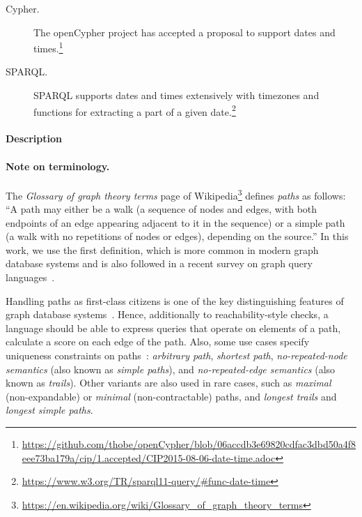 \begin{description}
\item[Cypher.] The openCypher project has accepted a proposal to support dates and times.\footnote{\url{https://github.com/thobe/openCypher/blob/06accdb3e69820cdfac3dbd50a4f8eee73ba179a/cip/1.accepted/CIP2015-08-06-date-time.adoc}}

\item[SPARQL.] SPARQL supports dates and times extensively with timezones and functions for extracting a part of a given date.\footnote{\url{https://www.w3.org/TR/sparql11-query/\#func-date-time}}
\end{description}





\paragraph{Description}

\paragraph{Note on terminology.} The \emph{Glossary of graph theory terms} page of Wikipedia\footnote{\url{https://en.wikipedia.org/wiki/Glossary_of_graph_theory_terms}} defines \emph{paths} as follows: ``A path may either be a walk (a sequence of nodes and edges, with both endpoints of an edge appearing adjacent to it in the sequence) or a simple path (a walk with no repetitions of nodes or edges), depending on the source.''
In this work, we use the first definition, which is more common in modern graph database systems and is also followed in a recent survey on graph query languages~\cite{DBLP:journals/csur/AnglesABHRV17}.

Handling paths as first-class citizens is one of the key distinguishing features of graph database 
systems~\cite{DBLP:conf/sigmod/AnglesABBFGLPPS18}. Hence, additionally to
reachability-style checks, a language should be able to express
queries that operate on elements of a path, \eg calculate a score on each edge
of the path.
Also, some use cases specify uniqueness constraints on paths~\cite{DBLP:journals/csur/AnglesABHRV17}:
\emph{arbitrary path},
\emph{shortest path},
\emph{no-repeated-node semantics} (also known as \emph{simple paths}), and
\emph{no-repeated-edge semantics} (also known as \emph{trails}).
Other variants are also used in rare cases, such as \emph{maximal} (non-expandable) or \emph{minimal} (non-contractable) paths, and \emph{longest trails} and \emph{longest simple paths}.

